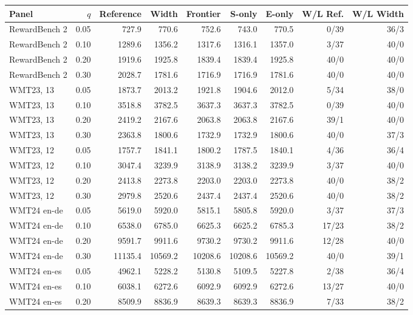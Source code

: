 \begin{table}[t]
\centering\small
\setlength{\tabcolsep}{4pt}
\begin{tabular}{lrrrrrrrr}
\toprule
Panel & $q$ & Reference & Width & Frontier & S-only & E-only & W/L Ref. & W/L Width \\
\midrule
RewardBench 2 & 0.05 & 727.9 & 770.6 & 752.6 & 743.0 & 770.5 & 0/39 & 36/3 \\
RewardBench 2 & 0.10 & 1289.6 & 1356.2 & 1317.6 & 1316.1 & 1357.0 & 3/37 & 40/0 \\
RewardBench 2 & 0.20 & 1919.6 & 1925.8 & 1839.4 & 1839.4 & 1925.8 & 40/0 & 40/0 \\
RewardBench 2 & 0.30 & 2028.7 & 1781.6 & 1716.9 & 1716.9 & 1781.6 & 40/0 & 40/0 \\
WMT23, 13 & 0.05 & 1873.7 & 2013.2 & 1921.8 & 1904.6 & 2012.0 & 5/34 & 38/0 \\
WMT23, 13 & 0.10 & 3518.8 & 3782.5 & 3637.3 & 3637.3 & 3782.5 & 0/39 & 40/0 \\
WMT23, 13 & 0.20 & 2419.2 & 2167.6 & 2063.8 & 2063.8 & 2167.6 & 39/1 & 40/0 \\
WMT23, 13 & 0.30 & 2363.8 & 1800.6 & 1732.9 & 1732.9 & 1800.6 & 40/0 & 37/3 \\
WMT23, 12 & 0.05 & 1757.7 & 1841.1 & 1800.2 & 1787.5 & 1840.1 & 4/36 & 36/4 \\
WMT23, 12 & 0.10 & 3047.4 & 3239.9 & 3138.9 & 3138.2 & 3239.9 & 3/37 & 40/0 \\
WMT23, 12 & 0.20 & 2413.8 & 2273.8 & 2203.0 & 2203.0 & 2273.8 & 40/0 & 38/2 \\
WMT23, 12 & 0.30 & 2979.8 & 2520.6 & 2437.4 & 2437.4 & 2520.6 & 40/0 & 38/2 \\
WMT24 en-de & 0.05 & 5619.0 & 5920.0 & 5815.1 & 5805.8 & 5920.0 & 3/37 & 37/3 \\
WMT24 en-de & 0.10 & 6538.0 & 6785.0 & 6625.3 & 6625.2 & 6785.3 & 17/23 & 38/2 \\
WMT24 en-de & 0.20 & 9591.7 & 9911.6 & 9730.2 & 9730.2 & 9911.6 & 12/28 & 40/0 \\
WMT24 en-de & 0.30 & 11135.4 & 10569.2 & 10208.6 & 10208.6 & 10569.2 & 40/0 & 39/1 \\
WMT24 en-es & 0.05 & 4962.1 & 5228.2 & 5130.8 & 5109.5 & 5227.8 & 2/38 & 36/4 \\
WMT24 en-es & 0.10 & 6038.1 & 6272.6 & 6092.9 & 6092.9 & 6272.6 & 13/27 & 40/0 \\
WMT24 en-es & 0.20 & 8509.9 & 8836.9 & 8639.3 & 8639.3 & 8836.9 & 7/33 & 38/2 \\

\end{tabular}
\end{table}
